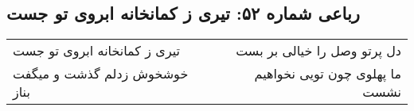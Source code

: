\begin{center}
\section*{رباعی شماره ۵۲: تیری ز کمانخانه ابروی تو جست}
\label{sec:sh052}
\begin{longtable}{l p{0.5cm} r}
تیری ز کمانخانه ابروی تو جست
&&
دل پرتو وصل را خیالی بر بست
\\
خوشخوش زدلم گذشت و میگفت بناز
&&
ما پهلوی چون تویی نخواهیم نشست
\\
\end{longtable}
\end{center}
